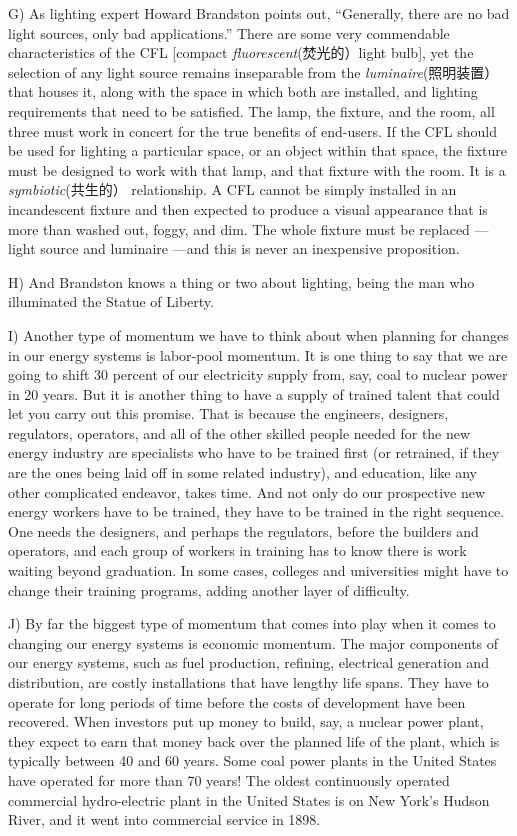 \documentclass[UTF8,11pt]{ctexart}
\begin{document}
G) As lighting expert Howard Brandston points out, “Generally, there are no bad light sources, only bad applications.” There are some very commendable characteristics of the CFL [compact\textit{ fluorescent}(焚光的）light bulb], yet the selection of any light source remains inseparable from the\textit{ luminaire}(照明装置）that houses it, along with the space in which both are installed, and lighting requirements that need to be satisfied. The lamp, the fixture, and the room, all three must work in concert for the true benefits of end-users. If the CFL should be used for lighting a particular space, or an object within that space, the fixture must be designed to work with that lamp, and that fixture with the room. It is a\textit{ symbiotic}(共生的） relationship. A CFL cannot be simply installed in an incandescent fixture and then expected to produce a visual appearance that is more than washed out, foggy, and dim. The whole fixture must be replaced —light source and luminaire —and this is never an inexpensive proposition.


H) And Brandston knows a thing or two about lighting, being the man who illuminated the Statue of Liberty.


I) Another type of momentum we have to think about when planning for changes in our energy systems is labor-pool momentum. It is one thing to say that we are going to shift 30 percent of our electricity supply from, say, coal to nuclear power in 20 years. But it is another thing to have a supply of trained talent that could let you carry out this promise. That is because the engineers, designers, regulators, operators, and all of the other skilled people needed for the new energy industry are specialists who have to be trained first (or retrained, if they are the ones being laid off in some related industry), and education, like any other complicated endeavor, takes time. And not only do our prospective new energy workers have to be trained, they have to be trained in the right sequence. One needs the designers, and perhaps the regulators, before the builders and operators, and each group of workers in training has to know there is work waiting beyond graduation. In some cases, colleges and universities might have to change their training programs, adding another layer of difficulty.


J) By far the biggest type of momentum that comes into play when it comes to changing our energy systems is economic momentum. The major components of our energy systems, such as fuel production, refining, electrical generation and distribution, are costly installations that have lengthy life spans. They have to operate for long periods of time before the costs of development have been recovered. When investors put up money to build, say, a nuclear power plant, they expect to earn that money back over the planned life of the plant, which is typically between 40 and 60 years. Some coal power plants in the United States have operated for more than 70 years! The oldest continuously operated commercial hydro-electric plant in the United States is on New York’s Hudson River, and it went into commercial service in 1898.
\end{document}
